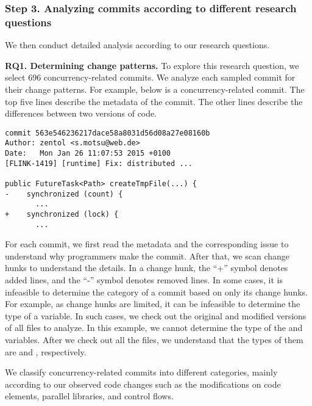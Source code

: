 \subsubsection{Step 3. Analyzing commits according to different research questions} We then conduct detailed analysis according to our research questions.


\textbf{RQ1. Determining change patterns.} To explore this research question, we select 696 concurrency-related commits. We analyze each sampled commit for their change patterns. For example, below is a concurrency-related commit. The top five lines describe the metadata of the commit. The other lines describe the differences between two versions of code.

\begin{lstlisting}
commit 563e546236217dace58a8031d56d08a27e08160b
Author: zentol <s.motsu@web.de>
Date:   Mon Jan 26 11:07:53 2015 +0100
[FLINK-1419] [runtime] Fix: distributed ...

public FutureTask<Path> createTmpFile(...) {
-    synchronized (count) {
       ...
+    synchronized (lock) {
       ...
\end{lstlisting}

For each commit, we first read the metadata and the corresponding issue to understand why programmers make the commit. After that, we scan change hunks to understand the details. In a change hunk, the ``+'' symbol denotes added lines, and the ``-'' symbol denotes removed lines. In some cases, it is infeasible to determine the category of a commit based on only its change hunks. For example, as change hunks are limited, it can be infeasible to determine the type of a variable. In such cases, we check out the original and modified versions of all files to analyze. In this example, we cannot determine the type of the  and  variables. After we check out all the files, we understand that the types of them are  and , respectively.

We classify concurrency-related commits into different categories, mainly according to our observed code changes such as the modifications on code elements, parallel libraries, and control flows.


